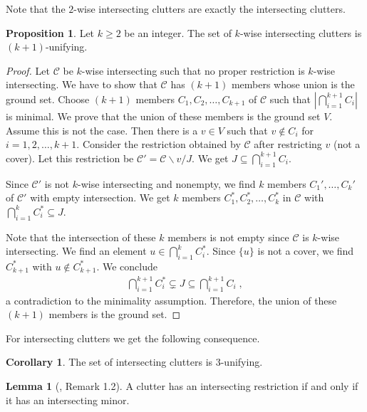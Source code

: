 \documentclass[a4paper, 12pt, twoside=false]{scrbook}
\theoremstyle{definition}
\newtheorem{corollary}[theorem]{Corollary}
\newtheorem{lemma}[theorem]{Lemma}
\newtheorem{proposition}[theorem]{Proposition}
\begin{document}
   Note that the $2$-wise intersecting clutters are exactly the intersecting clutters.
   \begin{proposition}
       Let $k\geq 2$ be an integer.
       The set of $k$-wise intersecting clutters is $(k+1)$-unifying.
   \end{proposition}

   \begin{proof}
       Let $\mathcal{C}$ be $k$-wise intersecting such that no proper restriction is $k$-wise intersecting.
       We have to show that $\mathcal{C}$ has $(k+1)$ members whose union is the ground set.
       Choose $(k+1)$ members $C_1, C_2, \ldots, C_{k+1}$ of $\mathcal{C}$ such that $|\bigcap_{i=1}^{k+1} C_i|$ is minimal.
       We prove that the union of these members is the ground set $V$.
       Assume this is not the case.
       Then there is a $v \in V$ such that $v \not\in C_i$ for $i=1,2, \ldots, k+1$.
       Consider the restriction obtained by $\mathcal{C}$ after restricting $v$ (not a cover).
       Let this restriction be $\mathcal{C'}=\mathcal{C} \backslash v / J$.
       We get $J \subseteq \bigcap_{i=1}^{k+1} C_i$.

       Since $\mathcal{C'}$ is not $k$-wise intersecting and nonempty, we find $k$ members $C_1',\ldots, C_k'$ of $\mathcal{C'}$ with empty intersection.
       We get $k$ members $C_1^*, C_2^*,\ldots, C_k^*$ in $\mathcal{C}$ with $\bigcap_{i=1}^k C_i^* \subseteq J$.

       Note that the intersection of these $k$ members is not empty since $\mathcal{C}$ is $k$-wise intersecting.
       We find an element $u \in \bigcap_{i=1}^k C_i^*$. Since $\{u\}$ is not a cover, we find $C_{k+1}^*$ with $u \not\in C_{k+1}^*$.
       We conclude
       \begin{align*}
           \bigcap_{i=1}^{k+1} C_i^* \subsetneq J \subseteq \bigcap_{i=1}^{k+1} C_i \;,
       \end{align*}
       a contradiction to the minimality assumption.
       Therefore, the union of these $(k+1)$ members is the ground set.


   \end{proof}

   For intersecting clutters we get the following consequence.
   \begin{corollary}
       The set of intersecting clutters is 3-unifying.
   \end{corollary}

   \begin{lemma}[\cite{restrictions}, Remark 1.2]
       A clutter has an intersecting restriction if and only if it has an intersecting minor.
   \end{lemma}
\end{document}
